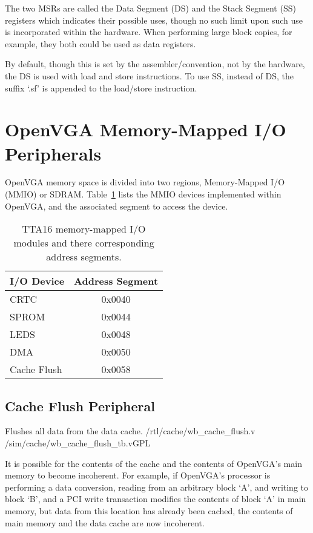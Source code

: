 The two MSRs are called the Data Segment (DS) and the Stack Segment (SS)
registers which indicates their possible uses, though no such limit upon
such use is incorporated within the hardware. When performing large block
copies, for example, they both could be used as data registers.

By default, though this is set by the assembler/convention, not by the
hardware, the DS is used with load and store instructions. To use SS, instead
of DS, the suffix `.sf' is appended to the load/store instruction.


\section{OpenVGA Memory-Mapped I/O Peripherals}
OpenVGA memory space is divided into two regions, Memory-Mapped I/O (MMIO) or
SDRAM. Table~\ref{TTAPROG_MMIO} lists the MMIO devices implemented within
OpenVGA, and the associated segment to access the device.

\begin{table}[h!]
\begin{center}
\begin{tabular}{l | c}
I/O Device	&	Address Segment	\\
\hline
CRTC		&	0x0040	\\
SPROM		&	0x0044	\\
LEDS		&	0x0048	\\
DMA			&	0x0050	\\
Cache Flush	&	0x0058	\\
\end{tabular}
\end{center}
\caption[TTA16 memory-mapped I/O modules and segments]{TTA16 memory-mapped I/O
modules and there corresponding address segments.}
\label{TTAPROG_MMIO}
\end{table}


\subsection{Cache Flush Peripheral}
\label{TTAPROG_Cache_Flush}

%
{Flushes all data from the data cache.}%
{/rtl/cache/wb\_cache\_flush.v}%
{/sim/cache/wb\_cache\_flush\_tb.v}{GPL}

It is possible for the contents of the cache and the contents of OpenVGA's main
memory to become incoherent. For example, if OpenVGA's processor is performing a data
conversion, reading from an arbitrary block `A', and writing to block `B', and a
PCI write transaction modifies the contents of block `A' in main memory, but data from
this location has already been cached, the contents of main memory and the data
cache are now incoherent.

